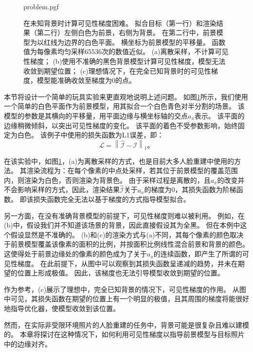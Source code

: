 \begin{figure}
    \centering
    {problem.pgf}
    \caption[在未知背景时计算可见性梯度困难]{
        在未知背景时计算可见性梯度困难。
        拟合目标（第一行）和渲染结果（第二行）左侧白色为前景，右侧为背景。
        在第二行中，前景模型为以红线为边界的白色平面。
        横坐标为前景模型的平移量。
        函数值为每像素均匀采样65536次的数值近似。
        (a)离散采样，不计算可见性梯度；
        (b)使用不准确的黑色背景模型计算可见性梯度，模型无法收敛到期望位置；
        (c)理想情况下，在完全已知背景时的可见性梯度，模型能准确收敛至梯度为0的点。
    }
    \label{fig:problem}
\end{figure}
本节将设计一个简单的玩具实验来更直观地说明上述问题。
如图\ref{fig:problem}所示，我们使用一个简单的白色平面作为前景模型，用其拟合一个白色青色对半分割的场景。
该模型的参数是其横向的平移量，用平面边缘与横坐标轴的交点$a_x$表示。
该平面的边缘稍微倾斜，以突出可见性梯度的变化。
该平面的着色不受参数影响，始终固定为白色。
该例子中使用的损失函数为L1误差，即：
\begin{equation}
\mathcal{L} = \left\| \hat{\mathcal{I}} - \mathcal{I} \right\|_1
\text{。}
\label{eq:loss_l1}
\end{equation}

在该实验中，如图\ref{fig:problem}，(a)为离散采样的方式，也是目前大多人脸重建中使用的方法。
其渲染流程为：在每个像素的中点处采样，若其位于前景模型的覆盖范围内，则渲染为白色，否则渲染为背景色。
由于采样过程是离散的，且$a_x$的改变并不会影响采样的方式，因此，渲染结果$\hat{\mathcal{I}}$关于$a_x$的梯度为0，其损失函数为阶梯函数。
即该损失函数完全无法以基于梯度的方式指导模型拟合。

另一方面，在没有准确背景模型的前提下，可见性梯度则难以被利用。
例如，在(b)中，假设我们并不知道该场景的背景，因此直接假设其为全黑。
但在本例中这个假设显然是不准确的。
(b)和(c)的渲染方式与(a)不同，其每个像素的颜色取决于前景模型覆盖该像素的面积的比例，并按面积比例线性混合前景和背景的颜色。
这使得处于前景边缘处的像素的颜色成为了关于$a_x$的连续函数，即产生了所谓的可见性梯度。
在此前提下，从图中可以观察到其损失函数呈递减的趋势，并未在期望的位置上形成极值。
因此，该梯度也无法引导模型收敛到期望的位置。

作为参考，(c)展示了理想中，完全已知背景的情况下，可见性梯度的作用。
从图中可见，其损失函数在期望的位置上有一个明显的极值，且其周围的梯度将能很好地指导优化器，使模型收敛到该位置。

然而，在实际非受限环境照片的人脸重建的任务中，背景可能是很复杂且难以建模的。
本章将探讨在这种情况下，如何利用可见性梯度以指导前景模型与目标照片中的边缘对齐。

